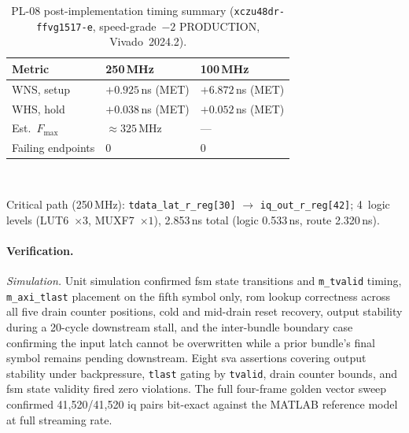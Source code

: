 \vspace{-30pt}\leavevmode\par
\begin{table}[!h]
  \caption{PL-08 post-implementation timing summary
           (\texttt{xczu48dr\allowbreak-ffvg1517\allowbreak-e}, speed-grade~$-2$
           PRODUCTION, Vivado~2024.2).}
  \label{tab:pl08_timing}
  \centering
  \begin{tabular}{lll}
    \hline
    Metric                   & 250\,MHz             & 100\,MHz           \\
    \hline
    WNS, setup               & $+0.925$\,ns (MET)   & $+6.872$\,ns (MET) \\[2pt]
    WHS, hold                & $+0.038$\,ns (MET)   & $+0.052$\,ns (MET) \\[2pt]
    Est.\ $F_{\max}$         & $\approx 325$\,MHz   & ---                \\[2pt]
    Failing endpoints        & 0                    & 0                  \\
    \hline
  \end{tabular}\\[4pt]
  \begin{minipage}{\linewidth}
    \small
    Critical path (250\,MHz):
    \texttt{tdata\_lat\_r\_reg[30]} $\to$ \texttt{iq\_out\_r\_reg[42]};
    4~logic levels (LUT6~$\times 3$, MUXF7~$\times 1$),
    2.853\,ns total (logic 0.533\,ns, route 2.320\,ns).
  \end{minipage}
\end{table}

\FloatBarrier


\paragraph{Verification.}

\textit{Simulation.}
Unit simulation confirmed \ac{fsm} state transitions and
\texttt{m\_tvalid} timing, \texttt{m\_axi\_tlast} placement on the
fifth symbol only, \ac{rom} lookup correctness across all five drain
counter positions, cold and mid-drain reset recovery, output stability
during a 20-cycle downstream stall, and the inter-bundle boundary case
confirming the input latch cannot be overwritten while a prior bundle's
final symbol remains pending downstream.
Eight \ac{sva} assertions covering output stability under backpressure,
\texttt{tlast} gating by \texttt{tvalid}, drain counter bounds, and
\ac{fsm} state validity fired zero violations.
The full four-frame golden vector sweep confirmed 41{,}520/41{,}520
\ac{iq} pairs bit-exact against the MATLAB reference model at full
streaming rate.

